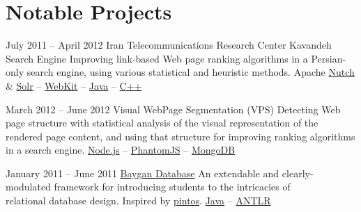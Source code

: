 \documentclass{tccv}
\begin{document}
{{\newpage





\section{Notable Projects}

\begin{project_list}

\item{July 2011 -- April 2012}
     {Iran Telecommunications Research Center}
     {Kavandeh Search Engine}
	 {Improving link-based Web page ranking algorithms in a Persian-only search engine, using various statistical and heuristic methods.}
     {%
     	Apache \href{http://nutch.apache.org}{Nutch} \&
		\href{http://lucene.apache.org/solr/}{Solr} -- 
		\href{http://www.webkit.org}{WebKit} -- 
		\href{http://www.oracle.com/technetwork/java/}{Java} -- 
		\href{https://en.wikipedia.org/wiki/C\%2B\%2B}{C++}%
	}

\vspace{-6pt}

\item{March 2012 -- June 2012}
     {}
     {Visual WebPage Segmentation {\large (VPS)}}
	 {Detecting Web page structure with statistical \mbox{analysis} of the visual representation of the rendered page content, and using that structure for improving ranking algorithms in a search engine.%
}
	 {%
	 	\href{http://nodejs.org}{Node.js} -- 
		\href{http://phantomjs.org}{PhantomJS} -- 
		\href{http://www.mongodb.org}{MongoDB}%
	 }

\vspace{-6pt}

\item{January 2011 -- June 2011}
	 {}
	 {\href{https://github.com/baygan/Baygan}{Baygan Database}}
	 {An extendable and clearly-modulated framework for introducing students to the intricacies of \\relational database design. Inspired by \href{http://www.stanford.edu/class/cs140/projects/pintos/pintos.html}{pintos}.%
}
	 {%
	 	\href{http://www.oracle.com/technetwork/java/}{Java} -- 
		\href{http://www.antlr.org}{ANTLR}%
	 }

\vspace{-6pt}
	 

\end{project_list}}}
\end{document}
